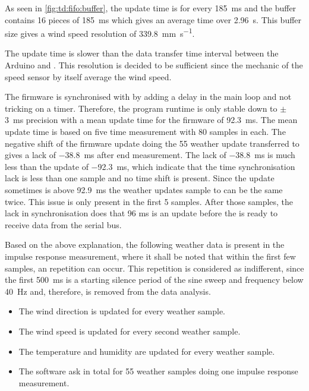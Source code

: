 As seen in \autoref{fig:td:fifo:buffer}, the update time is for every \SI{185}{\milli\second} and the buffer contains 16 pieces of \SI{185}{\milli\second} which gives an average time over \SI{2.96}{\second}. This buffer size gives a wind speed resolution of \SI{339.8}{\milli\meter\per\second}. 

The update time is slower than the data transfer time interval between the Arduino and \matlab.  This resolution is decided to be sufficient since the mechanic of the speed sensor by itself average the wind speed.

The firmware is synchronised with \matlab by adding a delay in the main loop and not tricking on a timer. Therefore, the program runtime is only stable down to $\pm$ \SI{3}{\milli\second} precision with a mean update time for the firmware of \SI{92.3}{\milli\second}. The mean update time is based on five time measurement with 80 samples in each. The negative shift of the firmware update doing the 55 weather update transferred to \matlab gives a lack of \SI{-38.8}{\milli\second} after end measurement.  The lack of \SI{-38.8}{\milli\second} is much less than the update of \SI{-92.3}{\milli\second}, which indicate that the time synchronisation lack is less than one sample and no time shift is present. Since the update sometimes is above \SI{92.9}{\milli\second} the weather updates sample to \matlab can be the same twice. This issue is only present in the first 5 samples. After those samples, the lack in synchronisation does that 96 ms is an update before the \matlab is ready to receive data from the serial bus.

Based on the above explanation, the following weather data is present in the impulse response measurement, where it shall be noted that within the first few samples, an repetition can occur. This repetition is considered as indifferent, since the first \SI{500}{\milli\second} is a starting silence period of the sine sweep and frequency below \SI{40}{\hertz} and, therefore, is removed from the data analysis. 

\begin{itemize}
\item The wind direction is updated for every weather sample.  
\item The wind speed is updated for every second weather sample.
\item The temperature and humidity are updated for every weather sample.
\item The \matlab software ask in total for 55 weather samples doing one impulse response measurement. 
\end{itemize}

